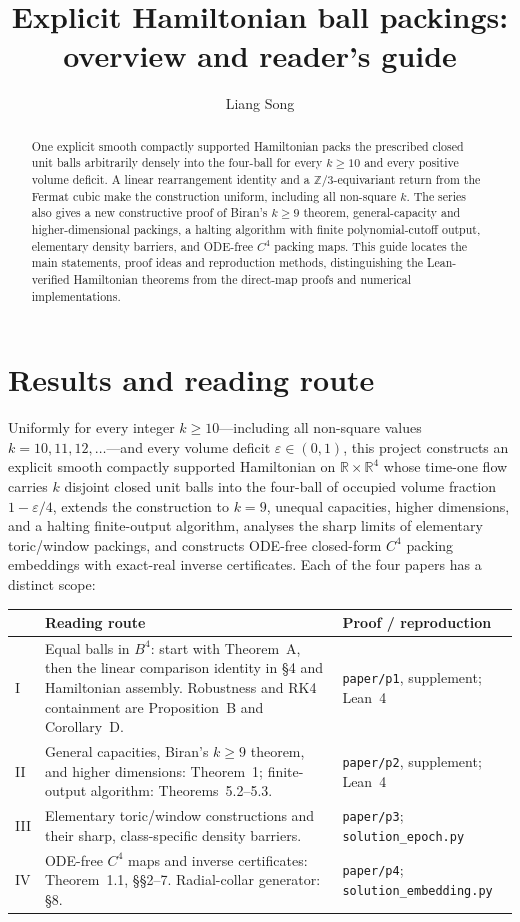 \documentclass[11pt]{amsart}
\title[Explicit Hamiltonian ball packings: overview]{Explicit Hamiltonian ball packings:\\ overview and reader's guide}
\author{Liang Song}
\date{}
\newcommand{\R}{\mathbb{R}}
\newcommand{\Z}{\mathbb{Z}}
\newcommand{\eps}{\varepsilon}
\begin{document}
\begin{abstract}
One explicit smooth compactly supported Hamiltonian packs the prescribed closed unit balls arbitrarily densely into
the four-ball for every $k\ge10$ and every positive volume deficit. A linear rearrangement identity and a
$\Z/3$-equivariant return from the Fermat cubic make the construction uniform, including all non-square $k$.
The series also gives a new constructive proof of Biran's $k\ge9$ theorem, general-capacity and higher-dimensional
packings, a halting algorithm with finite polynomial-cutoff output, elementary density barriers, and ODE-free $C^4$
packing maps. This guide locates the main statements, proof ideas and reproduction methods, distinguishing the
Lean-verified Hamiltonian theorems from the direct-map proofs and numerical implementations.
\end{abstract}
\maketitle

\section{Results and reading route}\label{sec:division}

Uniformly for every integer $k\ge10$---including all non-square values $k=10,11,12,\dots$---and every volume deficit
$\eps\in(0,1)$, this project constructs an explicit smooth compactly supported Hamiltonian on $\R\times\R^4$ whose
time-one flow carries $k$ disjoint closed unit balls into the four-ball of occupied volume fraction $1-\eps/4$, extends
the construction to $k=9$, unequal capacities, higher dimensions, and a halting finite-output algorithm, analyses the
sharp limits of elementary toric/window packings, and constructs ODE-free closed-form $C^4$ packing embeddings with
exact-real inverse certificates. Each of the four papers has a distinct scope:

\begin{center}\small
\renewcommand{\arraystretch}{1.12}
\begin{tabular}{@{}L{0.06\textwidth}L{0.58\textwidth}L{0.29\textwidth}@{}}
\toprule
 & Reading route & Proof / reproduction \\
\midrule
I & Equal balls in $B^4$: start with Theorem~A, then the linear comparison identity in \S4 and Hamiltonian assembly.
Robustness and RK4 containment are Proposition~B and Corollary~D. & \texttt{paper/p1}, supplement; Lean~4 \\
II & General capacities, Biran's $k\ge9$ theorem, and higher dimensions: Theorem~1; finite-output algorithm:
Theorems~5.2--5.3. & \texttt{paper/p2}, supplement; Lean~4 \\
III & Elementary toric/window constructions and their sharp, class-specific density barriers. & \texttt{paper/p3};
\texttt{solution\_epoch.py} \\
IV & ODE-free $C^4$ maps and inverse certificates: Theorem~1.1, \S\S2--7. Radial-collar generator: \S8. &
\texttt{paper/p4}; \texttt{solution\_embedding.py} \\
\bottomrule
\end{tabular}
\end{center}
\end{document}
